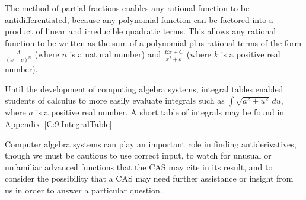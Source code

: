 \begin{summary}
\item The method of partial fractions enables any rational function to be antidifferentiated, because any polynomial function can be factored into a product of linear and irreducible quadratic terms.  This allows any rational function to be written as the sum of a polynomial plus rational terms of the form $\frac{A}{(x-c)^n}$ (where $n$ is a natural number) and $\frac{Bx+C}{x^2 + k}$ (where $k$ is a positive real number).
\item Until the development of computing algebra systems, integral tables enabled students of calculus to more easily evaluate integrals such as $\int \sqrt{a^2 + u^2} \, du$, where $a$ is a positive real number.  A short table of integrals may be found in Appendix~\ref{C:9.IntegralTable}.
\item Computer algebra systems can play an important role in finding antiderivatives, though we must be cautious to use correct input, to watch for unusual or unfamiliar advanced functions that the CAS may cite in its result, and to consider the possibility that a CAS may need further assistance or insight from us in order to answer a particular question.
\end{summary}

\nin \hrulefill

 

\clearpage

